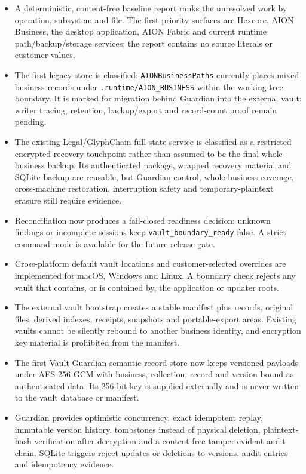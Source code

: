 \documentclass[11pt]{article}
\newcommand{\code}[1]{\texttt{#1}}
\begin{document}
\begin{itemize}
  \item A deterministic, content-free baseline report ranks the unresolved work by operation, subsystem and file. The first priority surfaces are Hexcore, AION Business, the desktop application, AION Fabric and current runtime path/backup/storage services; the report contains no source literals or customer values.
  \item The first legacy store is classified: \code{AIONBusinessPaths} currently places mixed business records under \code{.runtime/AION\_BUSINESS} within the working-tree boundary. It is marked for migration behind Guardian into the external vault; writer tracing, retention, backup/export and record-count proof remain pending.
  \item The existing Legal/GlyphChain full-state service is classified as a restricted encrypted recovery touchpoint rather than assumed to be the final whole-business backup. Its authenticated package, wrapped recovery material and SQLite backup are reusable, but Guardian control, whole-business coverage, cross-machine restoration, interruption safety and temporary-plaintext erasure still require evidence.
  \item Reconciliation now produces a fail-closed readiness decision: unknown findings or incomplete sessions keep \code{vault\_boundary\_ready} false. A strict command mode is available for the future release gate.
  \item Cross-platform default vault locations and customer-selected overrides are implemented for macOS, Windows and Linux. A boundary check rejects any vault that contains, or is contained by, the application or updater roots.
  \item The external vault bootstrap creates a stable manifest plus records, original files, derived indexes, receipts, snapshots and portable-export areas. Existing vaults cannot be silently rebound to another business identity, and encryption key material is prohibited from the manifest.
  \item The first Vault Guardian semantic-record store now keeps versioned payloads under AES-256-GCM with business, collection, record and version bound as authenticated data. Its 256-bit key is supplied externally and is never written to the vault database or manifest.
  \item Guardian provides optimistic concurrency, exact idempotent replay, immutable version history, tombstones instead of physical deletion, plaintext-hash verification after decryption and a content-free tamper-evident audit chain. SQLite triggers reject updates or deletions to versions, audit entries and idempotency evidence.

\end{itemize}
\end{document}
